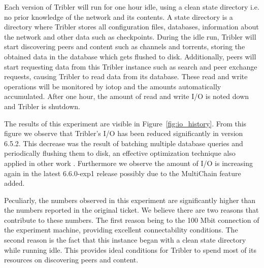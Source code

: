 Each version of Tribler will run for one hour idle, using a clean state directory i.e. no prior knowledge of the network and its contents.
A state directory is a directory where Tribler stores all configuration files, databases, information about the network and other data such as checkpoints.
During the idle run, Tribler will start discovering peers and content such as channels and torrents, storing the obtained data in the database which gets flushed to disk.
Additionally, peers will start requesting data from this Tribler instance such as search and peer exchange requests, causing Tribler to read data from its database.
These read and write operations will be monitored by iotop and the amounts automatically accumulated.
After one hour, the amount of read and write I/O is noted down and Tribler is shutdown.

The results of this experiment are visible in Figure~\ref{fig:io_history}.
From this figure we observe that Tribler's I/O has been reduced significantly in version 6.5.2.
This decrease was the result of batching multiple database queries and periodically flushing them to disk, an effective optimization technique also applied in other work \cite{ouyang2011beyond, lin2009database}. 
Furthermore we observe the amount of I/O is increasing again in the latest 6.6.0-exp1 release possibly due to the MultiChain feature added. 

Peculiarly, the numbers observed in this experiment are significantly higher than the numbers reported in the original ticket.
We believe there are two reasons that contribute to these numbers.
The first reason being to the 100 Mbit connection of the experiment machine, providing excellent connectability conditions. 
The second reason is the fact that this instance began with a clean state directory while running idle.
This provides ideal conditions for Tribler to spend most of its resources on discovering peers and content.


